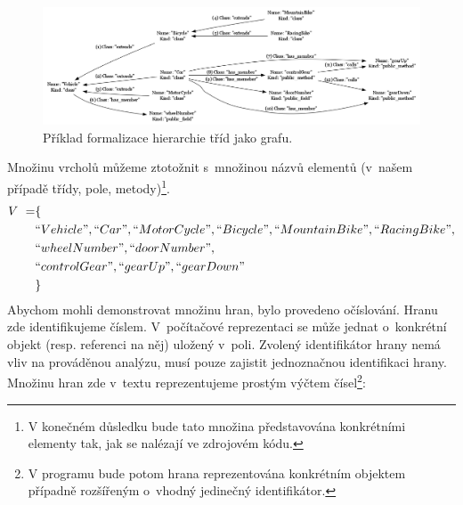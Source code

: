 \begin{figure}[h!]
  \centering
  \includegraphics[width=1.0\textwidth]{./graphs/graph_example.png}
  \caption{Příklad formalizace hierarchie tříd jako grafu.\label{design-graph_example}}
\end{figure}
Množinu vrcholů můžeme ztotožnit s~množinou názvů elementů (v~našem případě třídy, pole, metody)\footnote{V konečném důsledku bude tato množina představována konkrétními elementy tak, jak se nalézají ve zdrojovém kódu.}.
\begin{align*}
  V~= &\{ \\
  &``Vehicle", ``Car", ``MotorCycle", ``Bicycle", ``MountainBike", ``RacingBike", \\
  &``wheelNumber", ``doorNumber", \\
  &``controlGear", ``gearUp", ``gearDown" \\
  &\}
\end{align*}
Abychom mohli demonstrovat množinu hran, bylo provedeno očíslování. Hranu zde identifikujeme číslem. V~počítačové reprezentaci se může jednat o~konkrétní objekt (resp. referenci na něj) uložený v~poli. Zvolený identifikátor hrany nemá vliv na prováděnou analýzu, musí pouze zajistit jednoznačnou identifikaci hrany. Množinu hran zde v~textu reprezentujeme prostým výčtem čísel\footnote{V programu bude potom hrana reprezentována konkrétním objektem případně rozšířeným o~vhodný jedinečný identifikátor.}:


